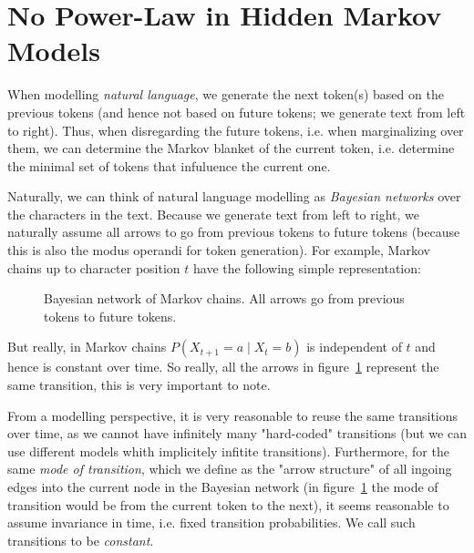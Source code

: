 \documentclass[../../main.tex]{subfiles}
\begin{document}
\section{No Power-Law in Hidden Markov Models}
    \label{section:no_power-law_in_hidden_markov_models}
    When modelling \emph{natural language}, we generate the next token(s) based on the previous tokens (and hence not based on future tokens; we generate text from left to right). Thus, when disregarding the future tokens, i.e. when marginalizing over them, we can determine the Markov blanket of the current token, i.e. determine the minimal set of tokens that infuluence the current one.

    Naturally, we can think of natural language modelling as \emph{Bayesian networks} over the characters in the text. Because we generate text from left to right, we naturally assume all arrows to go from previous tokens to future tokens (because this is also the modus operandi for token generation). For example, Markov chains up to character position $t$ have the following simple representation:

    \begin{figure}[h]
        \center
        \caption{Bayesian network of Markov chains. All arrows go from previous tokens to future tokens.}
        \label{fig:bayesian_network_markov_chain}
    \end{figure}

    But really, in Markov chains $P(X_{t + 1} = a \mid X_t = b)$ is independent of $t$ and hence is constant over time. So really, all the arrows in figure~\ref{fig:bayesian_network_markov_chain} represent the same transition, this is very important to note.

    From a modelling perspective, it is very reasonable to reuse the same transitions over time, as we cannot have infinitely many "hard-coded" transitions (but we can use different models whith implicitely infitite transitions). Furthermore, for the same \emph{mode of transition}, which we define as the "arrow structure" of all ingoing edges into the current node in the Bayesian network (in figure~\ref{fig:bayesian_network_markov_chain} the mode of transition would be from the current token to the next), it seems reasonable to assume invariance in time, i.e. fixed transition probabilities. We call such transitions to be \emph{constant}.
\end{document}
